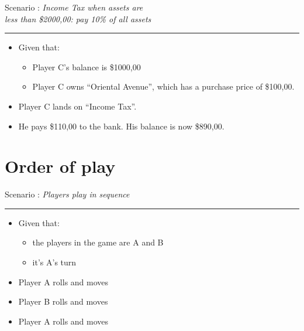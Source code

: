 \documentclass[handout,t,12pt]{beamer}
\newcommand{\Square}[1]{``#1''}
\newcommand{\money}[1]{\$#1,00}
\newcounter{scenarioid}\setcounter{scenarioid}{0}
\newenvironment{scenario}[1]{%
\addtocounter{scenarioid}{1} 
{\Large Scenario \thescenarioid: \emph{#1}\\[3px]\hrule}
\vspace{1\bigskipamount}
}{%
}
\begin{document}
  \begin{frame}
    \begin{scenario}{Income Tax when assets are\\less than \money{2000}: pay 10\% of all assets}
      \begin{itemize}
        \item Given that:
        \begin{itemize}
          \item Player C's balance is \money{1000}
          \item Player C owns \Square{Oriental Avenue}, which has a purchase price of \money{100}.
        \end{itemize}
        \item Player C lands on \Square{Income Tax}.
        \item He pays \money{110} to the bank.  His balance is now \money{890}.
      \end{itemize}
    \end{scenario}
  \end{frame}
  
  \section{Order of play}

  \begin{frame}
    \begin{scenario}{Players play in sequence}
      \begin{itemize}
        \item Given that:
        \begin{itemize}
          \item the players in the game are A and B
          \item it's A's turn
        \end{itemize}
        \item Player A rolls and moves
        \item Player B rolls and moves
        \item Player A rolls and moves
      \end{itemize}
    \end{scenario}
  \end{frame}
\end{document}
